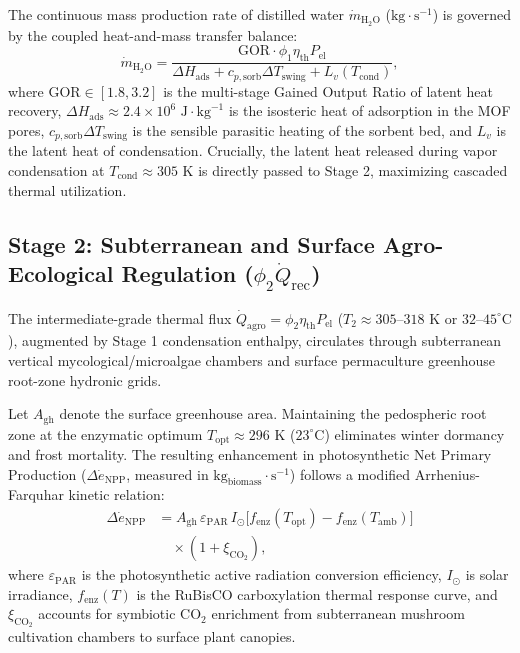 \documentclass[aps,pre,twocolumn,10pt,superscriptaddress,amsmath,amssymb,amsfonts,floatfix,showkeys]{revtex4-2}
\begin{document}
The continuous mass production rate of distilled water $\dot{m}_{\text{H}_2\text{O}}$ ($\text{kg}\cdot\text{s}^{-1}$) is governed by the coupled heat-and-mass transfer balance:
\begin{equation}
    \dot{m}_{\text{H}_2\text{O}} = \frac{\text{GOR} \cdot \phi_1 \eta_{\text{th}} P_{\text{el}}}{\Delta H_{\text{ads}} + c_{p,\text{sorb}} \Delta T_{\text{swing}} + L_v(T_{\text{cond}})},
    \label{eq:mof_water_rate}
\end{equation}
where $\text{GOR} \in [1.8, 3.2]$ is the multi-stage Gained Output Ratio of latent heat recovery, $\Delta H_{\text{ads}} \approx 2.4 \times 10^6\text{ J}\cdot\text{kg}^{-1}$ is the isosteric heat of adsorption in the MOF pores, $c_{p,\text{sorb}} \Delta T_{\text{swing}}$ is the sensible parasitic heating of the sorbent bed, and $L_v$ is the latent heat of condensation. Crucially, the latent heat released during vapor condensation at $T_{\text{cond}} \approx 305\text{ K}$ is directly passed to Stage 2, maximizing cascaded thermal utilization.

\subsection{Stage 2: Subterranean and Surface Agro-Ecological Regulation (\texorpdfstring{$\phi_2 \dot{Q}_{\text{rec}}$}{phi2 Qrec})}

The intermediate-grade thermal flux $\dot{Q}_{\text{agro}} = \phi_2 \eta_{\text{th}} P_{\text{el}}$ ($T_2 \approx 305\text{--}318\text{ K}$ or $32\text{--}45^\circ\text{C}$), augmented by Stage 1 condensation enthalpy, circulates through subterranean vertical mycological/microalgae chambers and surface permaculture greenhouse root-zone hydronic grids.

Let $A_{\text{gh}}$ denote the surface greenhouse area. Maintaining the pedospheric root zone at the enzymatic optimum $T_{\text{opt}} \approx 296\text{ K}$ ($23^\circ\text{C}$) eliminates winter dormancy and frost mortality. The resulting enhancement in photosynthetic Net Primary Production ($\Delta \dot{e}_{\text{NPP}}$, measured in $\text{kg}_{\text{biomass}}\cdot\text{s}^{-1}$) follows a modified Arrhenius-Farquhar kinetic relation:
\begin{equation}
\begin{aligned}
    \Delta \dot{e}_{\text{NPP}} &= A_{\text{gh}} \, \varepsilon_{\text{PAR}} \, I_{\odot} \big[ f_{\text{enz}}(T_{\text{opt}}) - f_{\text{enz}}(T_{\text{amb}}) \big] \\
    &\quad \times \left( 1 + \xi_{\text{CO}_2} \right),
\end{aligned}
\label{eq:npp_enhancement}
\end{equation}
where $\varepsilon_{\text{PAR}}$ is the photosynthetic active radiation conversion efficiency, $I_{\odot}$ is solar irradiance, $f_{\text{enz}}(T)$ is the RuBisCO carboxylation thermal response curve, and $\xi_{\text{CO}_2}$ accounts for symbiotic $\text{CO}_2$ enrichment from subterranean mushroom cultivation chambers to surface plant canopies.
\end{document}
